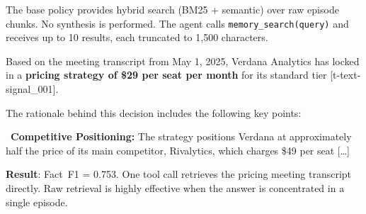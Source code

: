\documentclass[11pt,a4paper]{article}
\begin{document}
\begin{center}
\end{center}

The base policy provides hybrid search (BM25 + semantic) over raw episode chunks. No synthesis is performed. The agent calls \texttt{memory\_search(query)} and receives up to 10 results, each truncated to 1{,}500 characters.

\begin{tracebox}[title=base --- Agent Answer (1 tool call)]
\small
Based on the meeting transcript from May 1, 2025, Verdana Analytics has locked in a \textbf{pricing strategy of \$29 per seat per month} for its standard tier [t-text-signal\_001].

The rationale behind this decision includes the following key points:

\textbullet\ \textbf{Competitive Positioning:} The strategy positions Verdana at approximately half the price of its main competitor, Rivalytics, which charges \$49 per seat [\ldots]
\end{tracebox}

\textbf{Result}: Fact~F1 = 0.753. One tool call retrieves the pricing meeting transcript directly. Raw retrieval is highly effective when the answer is concentrated in a single episode.

\end{document}
